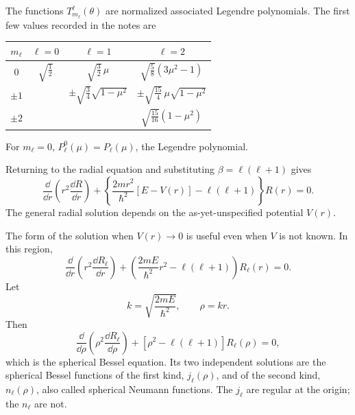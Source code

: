 The functions $T_{m_\ell}^{\ell}(\theta)$ are normalized associated Legendre polynomials.  The first few values recorded in the notes are
\begin{center}
\begin{tabular}{c c c c}
\toprule
$m_\ell$ & $\ell=0$ & $\ell=1$ & $\ell=2$\\
\midrule
$0$ & $\sqrt{\tfrac12}$
& $\sqrt{\tfrac32}\,\mu$
& $\sqrt{\tfrac58}(3\mu^2-1)$\\[2mm]
$\pm1$ &
& $\pm\sqrt{\tfrac34}\sqrt{1-\mu^2}$
& $\pm\sqrt{\tfrac{15}{4}}\,\mu\sqrt{1-\mu^2}$\\[2mm]
$\pm2$ & & & $\sqrt{\tfrac{15}{16}}(1-\mu^2)$\\
\bottomrule
\end{tabular}
\end{center}
For $m_\ell=0$, $P_\ell^0(\mu)=P_\ell(\mu)$, the Legendre polynomial.

Returning to the radial equation and substituting $\beta=\ell(\ell+1)$ gives
\begin{equation}
  \frac{\dd}{\dd r}\left(r^2\frac{\dd R}{\dd r}\right)
  +\left\{\frac{2mr^2}{\hbar^2}[E-V(r)]-\ell(\ell+1)\right\}R(r)=0.
  \label{eq:qs-radial-l}
\end{equation}
The general radial solution depends on the as-yet-unspecified potential $V(r)$.

The form of the solution when $V(r)\to0$ is useful even when $V$ is not known.  In this region,
\[
  \frac{\dd}{\dd r}\left(r^2\frac{\dd R_\ell}{\dd r}\right)
  +\left(\frac{2mE}{\hbar^2}r^2-\ell(\ell+1)\right)R_\ell(r)=0.
\]
Let
\[
  k=\sqrt{\frac{2mE}{\hbar^2}},
  \qquad
  \rho=kr.
\]
Then
\begin{equation}
  \frac{\dd}{\dd\rho}\left(\rho^2\frac{\dd R_\ell}{\dd\rho}\right)
  +\left[\rho^2-\ell(\ell+1)\right]R_\ell(\rho)=0,
  \label{eq:qs-spherical-bessel}
\end{equation}
which is the spherical Bessel equation.  Its two independent solutions are the spherical Bessel functions of the first kind, $j_\ell(\rho)$, and of the second kind, $n_\ell(\rho)$, also called spherical Neumann functions.  The $j_\ell$ are regular at the origin; the $n_\ell$ are not.

